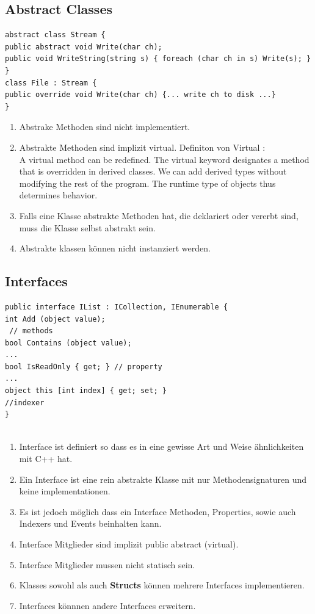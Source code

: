 \documentclass[a4paper,10pt]{scrartcl}
\begin{document}
\subsection{Abstract Classes}
\begin{lstlisting}[caption=Abstrakte Klassen]
 abstract class Stream {
public abstract void Write(char ch);
public void WriteString(string s) { foreach (char ch in s) Write(s); }
}
class File : Stream {
public override void Write(char ch) {... write ch to disk ...}
}

\end{lstlisting}
\pagebreak
\begin{enumerate}
 \item Abstrake Methoden sind nicht implementiert.
 \item Abstrakte Methoden sind implizit virtual.
  \subitem Definiton von Virtual :\\
  A virtual method can be redefined. The virtual keyword designates a method that is overridden in derived classes. We can add derived types without modifying the rest of the program. The runtime type of objects thus determines behavior.
  \item Falls eine Klasse abstrakte Methoden hat, die deklariert oder vererbt sind, muss die Klasse selbst abstrakt sein.
  \item Abstrakte klassen können nicht instanziert werden.
\end{enumerate}

\subsection{Interfaces}
\begin{lstlisting}[caption=Interface Beispiel]
 public interface IList : ICollection, IEnumerable {
int Add (object value);
 // methods
bool Contains (object value);
...
bool IsReadOnly { get; } // property
...
object this [int index] { get; set; }
//indexer
}


\end{lstlisting}

\begin{enumerate}
 \item Interface ist definiert so dass es in eine gewisse Art und Weise ähnlichkeiten mit C++ hat.
 \item Ein Interface ist eine rein abstrakte Klasse mit nur Methodensignaturen und keine implementationen.
 \item Es ist jedoch möglich dass ein Interface Methoden, Properties, sowie auch Indexers und Events beinhalten kann.
 \item Interface Mitglieder sind implizit public abstract (virtual).
 \item Interface Mitglieder mussen nicht statisch sein.
 \item Klasses sowohl als auch \textbf{Structs} können mehrere Interfaces implementieren.
 \item Interfaces könnnen andere Interfaces erweitern.
\end{enumerate}
\end{document}
